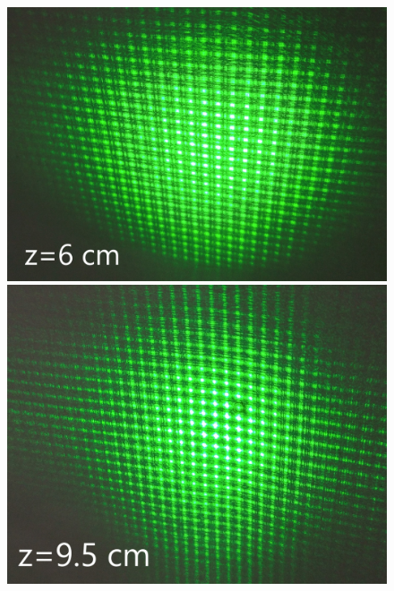 \documentclass[a4paper,12pt]{article} %
\begin{document}
\begin{figure}[h]
\begin{center}
\begin{minipage}[h]{0.4\linewidth}
\includegraphics[width=1\linewidth]{41}
\caption{} %
\label{ris:experimoriginal} %
\end{minipage}
\hfill 
\begin{minipage}[h]{0.4\linewidth}
\includegraphics[width=1\linewidth]{42}
\caption{}
\label{ris:experimcoded}
\end{minipage}
\end{center}
\end{figure}
\end{document}
